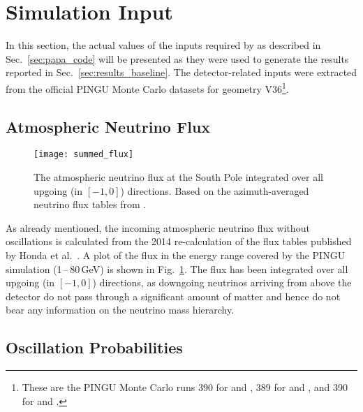 \section{Simulation Input}
\label{sec:sim_input}

In this section, the actual values of the inputs required by \papa as described
in Sec.~\ref{sec:papa_code} will be presented as they were used to generate the
results reported in Sec.~\ref{sec:results_baseline}. The detector-related
inputs were extracted from the official PINGU Monte Carlo datasets for geometry
V36\footnote{These are the PINGU Monte Carlo runs 390 for \nue and \nuebar, 389
for \numu and \numubar, and 390 for \nutau and \nutaubar.}.

\subsection{Atmospheric Neutrino Flux}
\label{sec:input_flux}

\begin{figure}[htbp]
 \centering
 \texttt{[image: summed\_flux]}
 \caption{The atmospheric neutrino flux at the South Pole integrated over all
          upgoing (\coszen in $[-1,0]$) directions. Based on the
          azimuth-averaged neutrino flux tables from \cite{HondaSP}.}
\label{fig:summed_flux}
\end{figure}

\noindent
As already mentioned, the incoming atmospheric neutrino flux without
oscillations is calculated from the 2014 re-calculation of the flux tables
published by Honda et al.\ \cite{Honda, HondaSP}. A plot of the flux in the
energy range covered by the PINGU simulation (1\,--\,80\,GeV) is shown in
Fig.~\ref{fig:summed_flux}. The flux has been integrated over all upgoing
(\coszen in $[-1,0]$) directions, as downgoing neutrinos arriving from above
the detector do not pass through a significant amount of matter and hence do
not bear any information on the neutrino mass hierarchy.

\subsection{Oscillation Probabilities}
\label{sec:input_osc}

